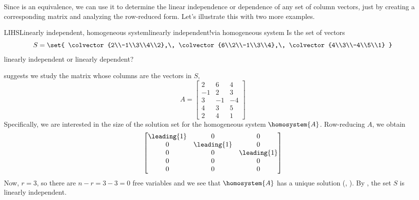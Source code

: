 %
Since  is an equivalence, we can use it to determine the linear independence or dependence of any set of column vectors, just by creating a corresponding matrix and analyzing the row-reduced form.  Let's illustrate this with two more examples.
%
\begin{example}{LIHS}{Linearly independent, homogeneous system}{linearly independent!via homogeneous system}
Is the set of vectors
%
\begin{equation*}
S=\set{
\colvector{2\\-1\\3\\4\\2},\,
\colvector{6\\2\\-1\\3\\4},\,
\colvector{4\\3\\-4\\5\\1}
}
\end{equation*}
%
linearly independent or linearly dependent?\par
%
 suggests we study the matrix whose columns are the vectors in $S$,
%
\begin{equation*}
A=
\begin{bmatrix}
2 & 6 & 4\\ 
-1 & 2 & 3\\ 
3 & -1 & -4\\ 
4 & 3 & 5\\ 
2 & 4 & 1
\end{bmatrix}
\end{equation*}
%
Specifically, we are interested in the size of the solution set for the homogeneous system $\homosystem{A}$.  Row-reducing $A$, we obtain
%
\begin{equation*}
\begin{bmatrix}
\leading{1} & 0 & 0\\ 
0 & \leading{1} & 0\\ 
0 & 0 & \leading{1}\\ 
0 & 0 & 0\\ 
0 & 0 & 0
\end{bmatrix}
\end{equation*}
%
Now, $r=3$, so there are $n-r=3-3=0$ free variables and we see that $\homosystem{A}$ has a unique solution  (, ).  By , the set $S$ is linearly independent.
%
\end{example}
